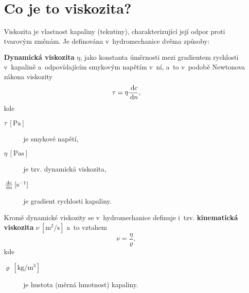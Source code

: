 
\section{Co je to viskozita?}
Viskozita je vlastnost kapaliny (tekutiny), charakterizující její odpor proti tvarovým změnám.
Je definována v~hydromechanice dvěma způsoby:

\textbf{Dynamická viskozita} $\eta$, jako konstanta úměrnosti mezi gradientem rychlosti v~kapalině a~odpovídajícím smykovým napětím v~ní, a~to v~podobě Newtonova zákona viskozity
\begin{equation}
	\tau = \eta \frac{\,\mathrm{d} c}{\,\mathrm{d} n},
\end{equation}
kde
\begin{description}
	\item[{$\tau\:[\si{\pascal}]$}] je smykové napětí,
	\item[{$\eta\:[\si{\pascal\second}]$}] je tzv. dynamická viskozita,
	\item[{$\tfrac{\,\mathrm{d} c}{\,\mathrm{d} n}\:[\si{\per\second}]$}] je gradient rychlosti kapaliny.
\end{description}

Kromě dynamické viskozity se v~hydromechanice definuje i~tzv. \textbf{kinematická viskozita} $\nu\:[\si{\meter\squared\per\second}]$ a~to vztahem
\begin{equation}
	\nu = \frac{\eta}{\varrho},
\end{equation}
kde
\begin{description}
	\item[{$\varrho\:[\si{\kilogram\per\meter\cubed}]$}] je hustota (měrná hmotnost) kapaliny.
\end{description}
